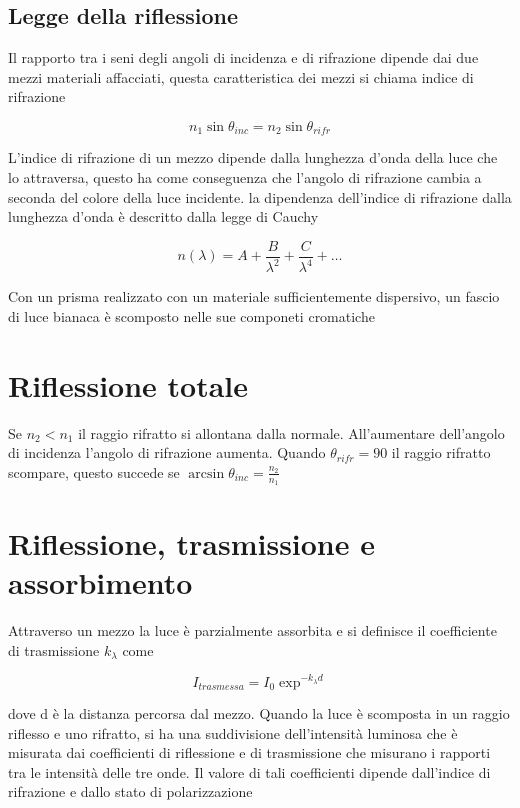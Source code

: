 \documentclass[a4paper,11pt]{report}
\begin{document}
\subsection*{Legge della riflessione}

Il rapporto tra i seni degli angoli di incidenza e di rifrazione dipende dai due mezzi materiali affacciati, questa caratteristica dei mezzi si chiama indice di rifrazione

\begin{equation*}
    n_1 \sin{\theta_{inc}} = n_2 \sin{\theta_{rifr}}
\end{equation*}

\noindent L'indice di rifrazione di un mezzo dipende dalla lunghezza d'onda della luce che lo attraversa, questo ha come conseguenza che l'angolo di rifrazione cambia a seconda del colore della luce incidente.
la dipendenza dell'indice di rifrazione dalla lunghezza d'onda è descritto dalla legge di Cauchy

\begin{equation*}
    n(\lambda) = A + \frac{B}{\lambda^2} + \frac{C}{\lambda^4} + \dots 
\end{equation*}

\noindent Con un prisma realizzato con un materiale sufficientemente dispersivo, un fascio di luce bianaca è scomposto nelle sue componeti cromatiche

\section{Riflessione totale}

Se $n_2 < n_1$ il raggio rifratto si allontana dalla normale. 
All'aumentare dell'angolo di incidenza l'angolo di rifrazione aumenta. 
Quando $\theta_{rifr} = 90$ il raggio rifratto scompare, questo succede se $\arcsin{\theta_{inc}} = \frac{n_2}{n_1}$

\section{Riflessione, trasmissione e assorbimento}

Attraverso un mezzo la luce è parzialmente assorbita e si definisce il coefficiente di trasmissione $k_\lambda$ come 

\begin{equation*}
    I_{trasmessa} = I_0\exp^{-k_\lambda d}
\end{equation*}

\noindent dove d è la distanza percorsa dal mezzo. \newline
Quando la luce è scomposta in un raggio riflesso e uno rifratto, si ha una suddivisione dell'intensità luminosa che è misurata dai coefficienti di riflessione e di trasmissione che misurano i rapporti tra le intensità delle tre onde.
Il valore di tali coefficienti dipende dall'indice di rifrazione e dallo stato di polarizzazione
\end{document}
